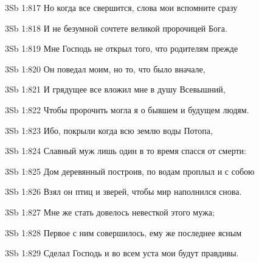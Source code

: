 \vs 3Sb 1:817 Но когда все свершится, слова мои вспомните сразу 

\vs 3Sb 1:818 И не безумной сочтете  великой пророчицей Бога. 

\vs 3Sb 1:819 Мне Господь не открыл того, что родителям прежде

\vs 3Sb 1:820 Он поведал моим, но то, что было вначале, 

\vs 3Sb 1:821 И грядущее все вложил мне в душу Всевышний, 

\vs 3Sb 1:822 Чтобы пророчить могла я о бывшем и будущем людям. 

\vs 3Sb 1:823 Ибо, покрыли когда всю землю воды Потопа, 

\vs 3Sb 1:824 Славный муж лишь один в то время спасся от смерти:

\vs 3Sb 1:825 Дом деревянный построив, по водам проплыл и с собою 

\vs 3Sb 1:826 Взял он птиц и зверей, чтобы мир наполнился снова. 

\vs 3Sb 1:827 Мне же стать довелось невесткой этого мужа; 

\vs 3Sb 1:828 Первое с ним совершилось, ему же последнее ясным 

\vs 3Sb 1:829 Сделал Господь  и во всем уста мои будут правдивы.

